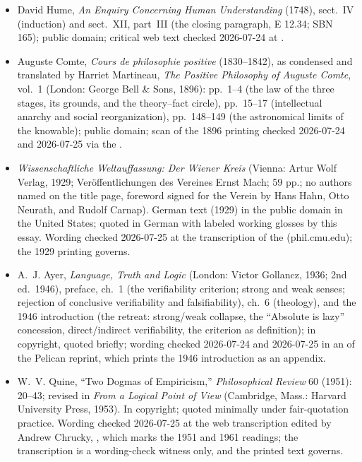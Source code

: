 {\fontsize{8.6}{9.6}\selectfont
\begin{itemize}[itemsep=0pt,parsep=0pt,topsep=0.05em]
\item David Hume, \emph{An Enquiry Concerning Human Understanding} (1748), sect.~IV (induction) and sect.~XII, part~III (the closing paragraph, E 12.34; SBN 165); public domain; critical web text checked 2026-07-24 at .
\item Auguste Comte, \emph{Cours de philosophie positive} (1830--1842), as condensed and translated by Harriet Martineau, \emph{The Positive Philosophy of Auguste Comte}, vol.~1 (London: George Bell \& Sons, 1896): pp.~1--4 (the law of the three stages, its grounds, and the theory--fact circle), pp.~15--17 (intellectual anarchy and social reorganization), pp.~148--149 (the astronomical limits of the knowable); public domain; scan of the 1896 printing checked 2026-07-24 and 2026-07-25 via the .
\item \emph{Wissenschaftliche Weltauffassung: Der Wiener Kreis} (Vienna: Artur Wolf Verlag, 1929; Ver\"offentlichungen des Vereines Ernst Mach; 59 pp.; no authors named on the title page, foreword signed for the Verein by Hans Hahn, Otto Neurath, and Rudolf Carnap). German text (1929) in the public domain in the United States; quoted in German with labeled working glosses by this essay. Wording checked 2026-07-25 at the transcription of the  (phil.cmu.edu); the 1929 printing governs.
\item A.~J. Ayer, \emph{Language, Truth and Logic} (London: Victor Gollancz, 1936; 2nd ed.\ 1946), preface, ch.~1 (the verifiability criterion; strong and weak senses; rejection of conclusive verifiability and falsifiability), ch.~6 (theology), and the 1946 introduction (the retreat: strong/weak collapse, the ``Absolute is lazy'' concession, direct/indirect verifiability, the criterion as definition); in copyright, quoted briefly; wording checked 2026-07-24 and 2026-07-25 in an  of the Pelican reprint, which prints the 1946 introduction as an appendix.
\item W.~V. Quine, ``Two Dogmas of Empiricism,'' \emph{Philosophical Review} 60 (1951): 20--43; revised in \emph{From a Logical Point of View} (Cambridge, Mass.: Harvard University Press, 1953). In copyright; quoted minimally under fair-quotation practice. Wording checked 2026-07-25 at the web transcription edited by Andrew Chrucky, , which marks the 1951 and 1961 readings; the transcription is a wording-check witness only, and the printed text governs.
\end{itemize}}

